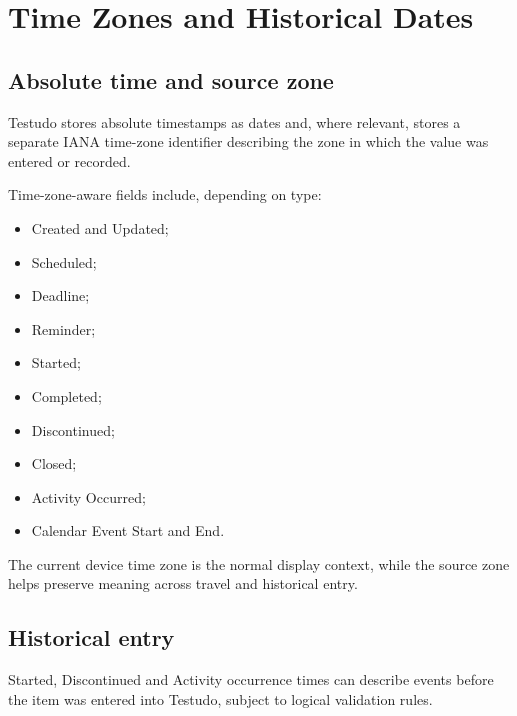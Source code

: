 \documentclass{testudomanual}
\begin{document}
\chapter{Time Zones and Historical Dates}

\section{Absolute time and source zone}

Testudo stores absolute timestamps as dates and, where relevant, stores a separate IANA time-zone identifier describing the zone in which the value was entered or recorded.

Time-zone-aware fields include, depending on type:
\begin{itemize}
    \item Created and Updated;
    \item Scheduled;
    \item Deadline;
    \item Reminder;
    \item Started;
    \item Completed;
    \item Discontinued;
    \item Closed;
    \item Activity Occurred;
    \item Calendar Event Start and End.
\end{itemize}

The current device time zone is the normal display context, while the source zone helps preserve meaning across travel and historical entry.

\section{Historical entry}

Started, Discontinued and Activity occurrence times can describe events before the item was entered into Testudo, subject to logical validation rules.


\end{document}
